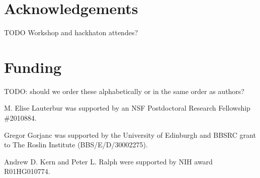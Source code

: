 \documentclass[hidelinks]{article}
\begin{document}
\hypertarget{acknowledgements}{%
\section*{Acknowledgements}\label{acknowledgements}}

TODO Workshop and hackhaton attendes?

\hypertarget{funding}{%
\section*{Funding}\label{funding}}

TODO: should we order these alphabetically or in the same order as authors?

M. Elise Lauterbur was supported by an NSF Postdoctoral Research Fellowship \#2010884.

Gregor Gorjanc was supported by the University of Edinburgh and BBSRC grant to The Roslin Institute (BBS/E/D/30002275).

Andrew D. Kern and Peter L. Ralph were supported by NIH award R01HG010774.


\end{document}
